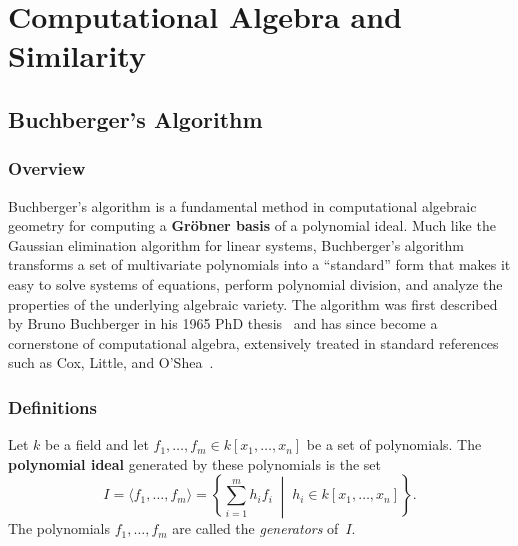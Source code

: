 \chapter{Computational Algebra and Similarity}
\label{ch:algebra}

\section{Buchberger's Algorithm}
\label{sec:buchbergers_algorithm}

\subsection{Overview}
Buchberger's algorithm is a fundamental method in computational algebraic geometry for computing a \textbf{Gr\"obner basis} of a polynomial ideal. Much like the Gaussian elimination algorithm for linear systems, Buchberger's algorithm transforms a set of multivariate polynomials into a ``standard'' form that makes it easy to solve systems of equations, perform polynomial division, and analyze the properties of the underlying algebraic variety. The algorithm was first described by Bruno Buchberger in his 1965 PhD thesis~\cite{buchberger1965} and has since become a cornerstone of computational algebra, extensively treated in standard references such as Cox, Little, and O'Shea~\cite{cox2007}.

\subsection{Definitions}

\begin{definition}\label{def:polynomial_ideal}
Let $k$ be a field and let $f_1, \dots, f_m \in k[x_1, \dots, x_n]$ be a set of polynomials. The \textbf{polynomial ideal} generated by these polynomials is the set
\[
I = \langle f_1, \dots, f_m \rangle = \left\{ \sum_{i=1}^{m} h_i f_i \;\middle|\; h_i \in k[x_1, \dots, x_n] \right\}.
\]
The polynomials $f_1, \dots, f_m$ are called the \emph{generators} of~$I$.
\end{definition}

